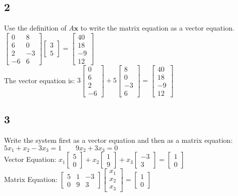 \documentclass{article}
\begin{document}
\subsection*{2}
Use the definition of $A\mathbf{x}$ to write the matrix equation as a vector equation.
$\begin{bmatrix} 0 & 8 \\ 6 & 0 \\ 2 & -3 \\ -6 & 6 \end{bmatrix}\begin{bmatrix} 3 \\ 5 \end{bmatrix}=\begin{bmatrix} 40 \\ 18 \\ -9 \\ 12 \end{bmatrix}$
\\The vector equation is: $3\begin{bmatrix}
    0\\6\\2\\-6
\end{bmatrix}+5\begin{bmatrix}
    8\\0\\-3\\6
\end{bmatrix}=\begin{bmatrix}
    40\\18\\-9\\12
\end{bmatrix}$
\subsection*{3}
Write the system first as a vector equation and then as a matrix equation: \\$5x_1+x_2-3x_3=1 \qquad 9x_2+3x_3=0$
\\[0.1in] Vector Equation: $x_1 \begin{bmatrix}5\\0\end{bmatrix} +x_2 \begin{bmatrix}1\\9\end{bmatrix} + x_3 \begin{bmatrix}-3 \\3\end{bmatrix}=\begin{bmatrix}1\\0\end{bmatrix}$
\\[0.1in] Matrix Equation: $\begin{bmatrix}5&1&-3\\0&9&3\end{bmatrix}\begin{bmatrix}x_1\\x_2\\x_3\end{bmatrix} = \begin{bmatrix}1\\0\end{bmatrix}$
\end{document}
